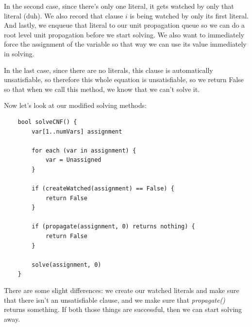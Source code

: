 \documentclass[oneside]{book}
\begin{document}
In the second case, since there's only one literal, it gets watched by only that 
literal (duh). We also record that clause $i$ is being watched by only its first literal.
And lastly, we enqueue that literal to our unit propagation queue so we can do a root 
level unit propagation before we start solving. We also want to immediately force the 
assignment of the variable so that way we can use its value immediately in solving.

In the last case, since there are no literals, this clause is automatically unsatisfiable, 
so therefore this whole equation is unsatisfiable, so we return False so that when we call 
this method, we know that we can't solve it. 

Now let's look at our modified solving methods:

\begin{lstlisting}
    bool solveCNF() {
        var[1..numVars] assignment

        for each (var in assignment) {
            var = Unassigned
        }

        if (createWatched(assignment) == False) {
            return False
        }

        if (propagate(assignment, 0) returns nothing) {
            return False
        }

        solve(assignment, 0)
    }
\end{lstlisting}

There are some slight differences: we create our watched literals and make sure 
that there isn't an unsatisfiable clause, and we make sure that \textit{propagate()}
returns something. If both those things are successful, then we can start solving away.
\end{document}

